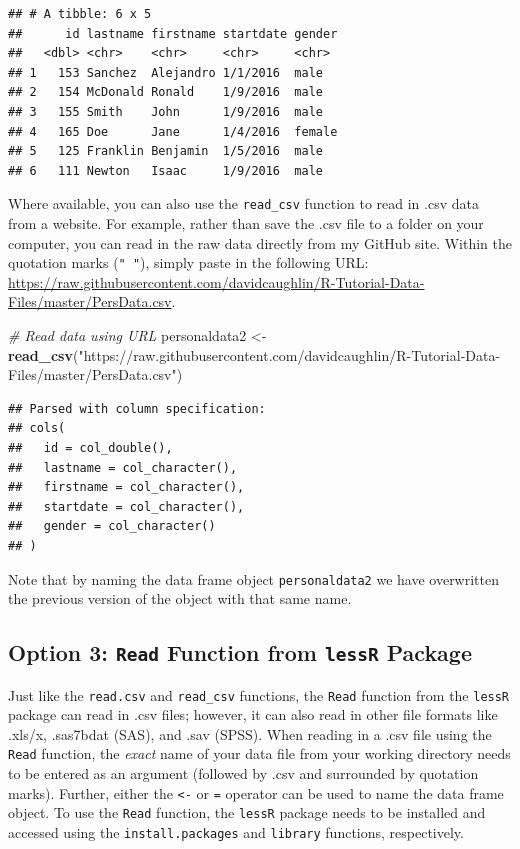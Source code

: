 \documentclass[]{book}
\newenvironment{Shaded}{\begin{snugshade}}{\end{snugshade}}
\newcommand{\KeywordTok}[1]{\textcolor[rgb]{0.13,0.29,0.53}{\textbf{#1}}}
\newcommand{\StringTok}[1]{\textcolor[rgb]{0.31,0.60,0.02}{#1}}
\newcommand{\CommentTok}[1]{\textcolor[rgb]{0.56,0.35,0.01}{\textit{#1}}}
\newcommand{\NormalTok}[1]{#1}
\begin{document}
\begin{verbatim}
## # A tibble: 6 x 5
##      id lastname firstname startdate gender
##   <dbl> <chr>    <chr>     <chr>     <chr> 
## 1   153 Sanchez  Alejandro 1/1/2016  male  
## 2   154 McDonald Ronald    1/9/2016  male  
## 3   155 Smith    John      1/9/2016  male  
## 4   165 Doe      Jane      1/4/2016  female
## 5   125 Franklin Benjamin  1/5/2016  male  
## 6   111 Newton   Isaac     1/9/2016  male
\end{verbatim}

Where available, you can also use the \texttt{read\_csv} function to
read in .csv data from a website. For example, rather than save the .csv
file to a folder on your computer, you can read in the raw data directly
from my GitHub site. Within the quotation marks (\texttt{"\ "}), simply
paste in the following URL:
\url{https://raw.githubusercontent.com/davidcaughlin/R-Tutorial-Data-Files/master/PersData.csv}.

\begin{Shaded}
\begin{Highlighting}[]
\CommentTok{# Read data using URL}
\NormalTok{personaldata2 <-}\StringTok{ }\KeywordTok{read_csv}\NormalTok{(}\StringTok{"https://raw.githubusercontent.com/davidcaughlin/R-Tutorial-Data-Files/master/PersData.csv"}\NormalTok{)}
\end{Highlighting}
\end{Shaded}

\begin{verbatim}
## Parsed with column specification:
## cols(
##   id = col_double(),
##   lastname = col_character(),
##   firstname = col_character(),
##   startdate = col_character(),
##   gender = col_character()
## )
\end{verbatim}

Note that by naming the data frame object \texttt{personaldata2} we have
overwritten the previous version of the object with that same name.

\subsection{\texorpdfstring{Option 3: \texttt{Read} Function from
\texttt{lessR}
Package}{Option 3: Read Function from lessR Package}}\label{option-3-read-function-from-lessr-package}

Just like the \texttt{read.csv} and \texttt{read\_csv} functions, the
\texttt{Read} function from the \texttt{lessR} package
\citep{R-lessR2020} can read in .csv files; however, it can also read in
other file formats like .xls/x, .sas7bdat (SAS), and .sav (SPSS). When
reading in a .csv file using the \texttt{Read} function, the
\emph{exact} name of your data file from your working directory needs to
be entered as an argument (followed by .csv and surrounded by quotation
marks). Further, either the \texttt{\textless{}-} or \texttt{=} operator
can be used to name the data frame object. To use the \texttt{Read}
function, the \texttt{lessR} package needs to be installed and accessed
using the \texttt{install.packages} and \texttt{library} functions,
respectively.
\end{document}

